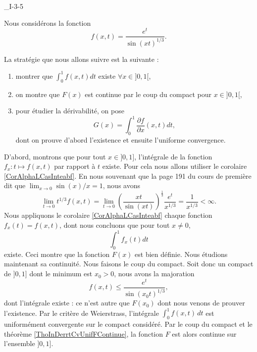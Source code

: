 

\begin{corrige}{_I-3-5}

Nous considérons la fonction 
\begin{equation}
	f(x,t)=\frac{  e^{t} }{  \sin(xt)^{1/3} }.
\end{equation}

La stratégie que nous allons suivre est la suivante :
\begin{enumerate}
	\item montrer que $\int_{0}^1f(x,t)dt$ existe $\forall x\in]0,1[$,
	\item on montre que $F(x)$ est continue par le coup du compact pour $x\in]0,1[$,
	\item pour étudier la dérivabilité, on pose
	\begin{equation}
		G(x)=\int_0^1\frac{ \partial f }{ \partial x }(x,t)dt,
	\end{equation}
	dont on prouve d'abord l'existence et ensuite l'uniforme convergence.
\end{enumerate}

D'abord, montrons que pour tout $x\in ]0,1]$, l'intégrale de la fonction $f_x\colon t\mapsto f(x,t)$ par rapport à $t$ existe. Pour cela nous allons utiliser le corolaire \ref{CorAlphaLCasInteabf}. En nous souvenant que la page 191 du cours de première dit que $\lim_{x\to 0}\sin(x)/x=1$, nous avons
\begin{equation}
		\lim_{t\to0}t^{1/3}f(x,t)=\lim_{t\to 0}\left( \frac{ xt }{ \sin(xt) } \right)^{\frac{ 1 }{ 3 }}\frac{ e^t }{ x^{1/3} }=\frac{1}{ x^{1/3} }<\infty.
\end{equation}
Nous appliquons le corolaire \ref{CorAlphaLCasInteabf} chaque fonction $f_x(t)=f(x,t)$, dont nous concluons que pour tout $x\neq 0$,
\begin{equation}
	\int_0^1 f_x(t)dt
\end{equation}
existe. Ceci montre que la fonction $F(x)$ est bien définie. Nous étudions maintenant sa continuité. Nous faisons le coup du compact. Soit donc un compact de $]0,1]$ dont le minimum est $x_0>0$, nous avons la majoration
\begin{equation}
	f(x,t)\leq\frac{ e^t }{ \sin(x_0t)^{1/3} },
\end{equation}
dont l'intégrale existe : ce n'est autre que $F(x_0)$ dont nous venons de prouver l'existence. Par le critère de Weierstrass, l'intégrale $\int_0^1f(x,t)\,dt$ est uniformément convergente sur le compact considéré. Par le coup du compact et le théorème \ref{ThoInDerrtCvUnifFContinue}, la fonction $F$ est alors continue sur l'ensemble $]0,1]$.


\end{corrige}

